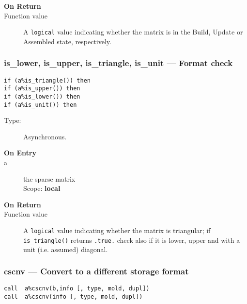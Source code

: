 \begin{description}
\item[\bf On Return]
\item[Function value] A \verb|logical| value indicating whether the
  matrix is in the Build, Update or Assembled state, respectively. 
\end{description}

\subsubsection{is\_lower, is\_upper, is\_triangle, is\_unit  ---
  Format  check}

\begin{verbatim}
if (a%is_triangle()) then 
if (a%is_upper()) then 
if (a%is_lower()) then 
if (a%is_unit()) then 
\end{verbatim}

\begin{description}
\item[Type:] Asynchronous.
\item[\bf On Entry]
\item[a] the sparse matrix\\
Scope: {\bf local}\\
\end{description}

\begin{description}
\item[\bf On Return]
\item[Function value] A \verb|logical| value indicating whether the
  matrix is triangular; if \verb|is_triangle()| returns \verb|.true.|
  check also if it is lower, upper and with a unit (i.e. assumed)
  diagonal. 
\end{description}


\subsubsection{cscnv --- Convert to a different storage format}

\begin{verbatim}
call  a%cscnv(b,info [, type, mold, dupl])
call  a%cscnv(info [, type, mold, dupl])
\end{verbatim}

